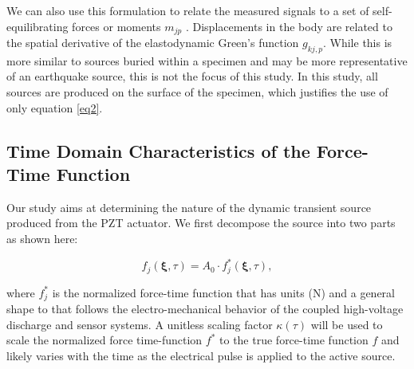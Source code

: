 \documentclass[preprint,3p, 11pt,authoryear]{elsarticle}
\begin{document}
\noindent We can also use this formulation to relate the measured signals to a set of self-equilibrating forces or moments $m_{jp}$ \citep{Aki2002}. Displacements in the body are related to the spatial derivative of the elastodynamic Green's function $g_{kj,p}$.  While this is more similar to sources buried within a specimen and may be more representative of an earthquake source, this is not the focus of this study.  In this study, all sources are produced on the surface of the specimen, which justifies the use of only equation \eqref{eq2}.

\subsection{Time Domain Characteristics of the Force-Time Function}
\label{force_time}

Our study aims at determining the nature of the dynamic transient source produced from the PZT actuator. We first decompose the source into two parts as shown here:

\begin{equation}
    \label{eq4}
    f_{j}\left( \mathbf{\xi}, \tau \right) =A_{0} \cdot f^{*}_{j}\left( \mathbf{\xi}, \tau \right) ,
\end{equation}

\noindent where $f^{*}_{j}$ is the normalized force-time function that has units (N) and a general shape to that follows the electro-mechanical behavior of the coupled high-voltage discharge and sensor systems.  A unitless scaling factor $\kappa(\tau)$ will be used to scale the normalized force time-function $f^{*}$ to the true force-time function $f$ and likely varies with the time as the electrical pulse is applied to the active source.
\end{document}
